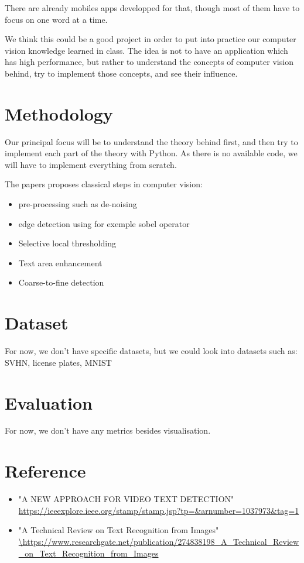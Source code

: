 \documentclass[10pt,a4paper]{article}
\begin{document}
There are already mobiles apps developped for that, though most of them have to focus on one word at a time.


We think this could be a good project in order to put into practice our computer vision knowledge learned in class. The idea is not to have an application which has high performance, but rather to understand the concepts of computer vision behind, try to implement those concepts, and see their influence.


\section{Methodology}
Our principal focus will be to understand the theory behind first, and then try to implement each part of the theory with Python. As there is no available code, we will have to implement everything from scratch.

The papers proposes classical steps in computer vision:
\begin{itemize}
\item pre-processing such as de-noising
\item edge detection using for exemple sobel operator
\item Selective local thresholding 
\item Text area enhancement 
\item Coarse-to-fine detection 
\end{itemize}
\section{Dataset}
For now, we don't have specific datasets, but we could look into datasets such as:
SVHN, license plates, MNIST

\section{Evaluation}
For now, we don't have any metrics besides visualisation.

\section{Reference}
\begin{itemize}
\item "A NEW APPROACH FOR VIDEO TEXT DETECTION" \\
\url{https://ieeexplore.ieee.org/stamp/stamp.jsp?tp=&arnumber=1037973&tag=1}

\item "A Technical Review on Text Recognition from Images" \\
\url{\https://www.researchgate.net/publication/274838198_A_Technical_Review_on_Text_Recognition_from_Images}
\end{itemize}
\end{document}
